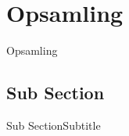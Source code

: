 \section{Opsamling}
\begin{frame}{Opsamling}

\end{frame}

\subsection{Sub Section}
\begin{frame}{Sub Section}{Subtitle}

\end{frame}